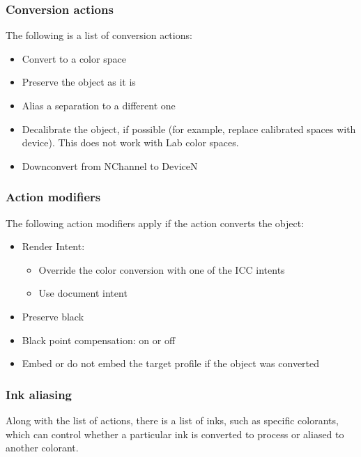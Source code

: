\documentclass[letterpaper,12pt,english,openany,oneside]{sphinxmanual}
\begin{document}
\subsubsection{Conversion actions}
\label{\detokenize{Plugins_ExtendedAPI:conversion-actions}}
The following is a list of conversion actions:
\begin{itemize}
\item {} 
Convert to a color space

\item {} 
Preserve the object as it is

\item {} 
Alias a separation to a different one

\item {} 
Decalibrate the object, if possible (for example, replace calibrated spaces with device). This does not work with Lab color spaces.

\item {} 
Downconvert from NChannel to DeviceN

\end{itemize}


\subsubsection{Action modifiers}
\label{\detokenize{Plugins_ExtendedAPI:action-modifiers}}
The following action modifiers apply if the action converts the object:
\begin{itemize}
\item {} 
Render Intent:
\begin{itemize}
\item {} 
Override the color conversion with one of the ICC intents

\item {} 
Use document intent

\end{itemize}

\item {} 
Preserve black

\item {} 
Black point compensation: on or off

\item {} 
Embed or do not embed the target profile if the object was converted

\end{itemize}


\subsubsection{Ink aliasing}
\label{\detokenize{Plugins_ExtendedAPI:ink-aliasing}}
Along with the list of actions, there is a list of inks, such as specific colorants, which can control whether a particular ink is converted to process or aliased to another colorant.
\end{document}
